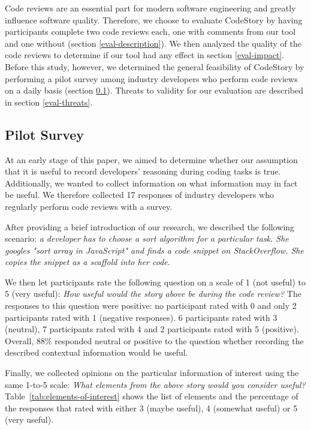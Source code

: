 \documentclass[../manifest.tex]{subfiles}
\begin{document}
Code reviews are an essential part for modern software engineering and greatly influence software quality. Therefore, we choose to evaluate CodeStory by having participants complete two code reviews each, one with comments from our tool and one without (section \ref{eval-description}). We then analyzed the quality of the code reviews to determine if our tool had any effect in section \ref{eval-impact}. Before this study, however, we determined the general feasibility of CodeStory by performing a pilot survey among industry developers who perform code reviews on a daily basis (section \ref{eval-survey}). Threats to validity for our evaluation are described in section \ref{eval-threats}.

\subsection{Pilot Survey} \label{eval-survey}

At an early stage of this paper, we aimed to determine whether our assumption that it is useful to record developers' reasoning during coding tasks is true. Additionally, we wanted to collect information on what information may in fact be useful. We therefore collected 17 responses of industry developers who regularly perform code reviews with a survey.

After providing a brief introduction of our research, we described the following scenario: \textit{a developer has to choose a sort algorithm for a particular task. She googles "sort array in JavaScript" and finds a code snippet on StackOverflow. She copies the snippet as a scaffold into her code}.

We then let participants rate the following question on a scale of 1 (not useful) to 5 (very useful): \textit{How useful would the story above be during the code review?} The responses to this question were positive: no participant rated with 0 and only 2 participants rated with 1 (negative responses). 6 participants rated with 3 (neutral), 7 participants rated with 4 and 2 participants rated with 5 (positive). Overall, 88\% responded neutral or positive to the question whether recording the described contextual information would be useful.

Finally, we collected opinions on the particular information of interest using the same 1-to-5 scale: \textit{What elements from the above story would you consider useful?} Table~\ref{tab:elements-of-interest} shows the list of elements and the percentage of the responses that rated with either 3 (maybe useful), 4 (somewhat useful) or 5 (very useful).
\end{document}
